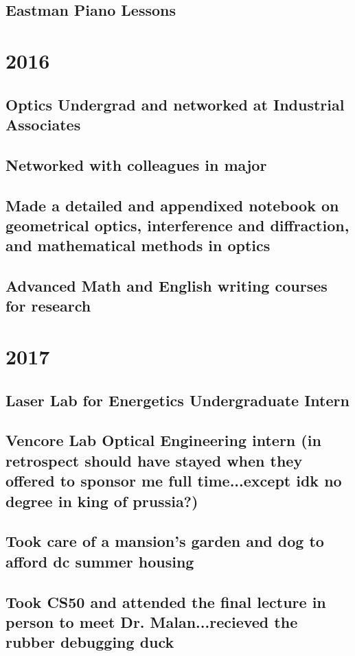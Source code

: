 \documentclass{article}
\begin{document}
\subsection{Eastman Piano Lessons}

\section{2016}
\subsection{Optics Undergrad and networked at Industrial Associates}
\subsection{Networked with colleagues in major}

\subsection{Made a detailed and appendixed notebook on geometrical optics, interference and diffraction, and mathematical methods in optics}
\subsection{Advanced Math and English writing courses for research}

\section{2017}
\subsection{Laser Lab for Energetics Undergraduate Intern}
\subsection{Vencore Lab Optical Engineering intern (in retrospect should have stayed when they offered to sponsor me full time...except idk no degree in king of prussia?)}
\subsection{Took care of a mansion's garden and dog to afford dc summer housing}
\subsection{Took CS50 and attended the final lecture in person to meet Dr. Malan...recieved the rubber debugging duck}
\end{document}
